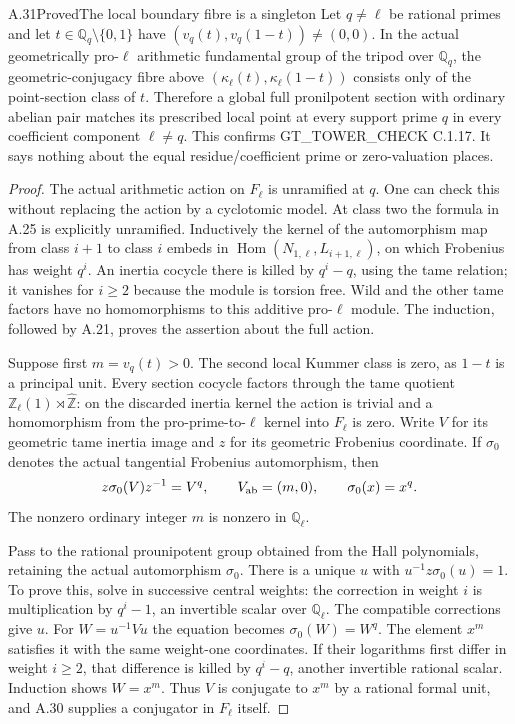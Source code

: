 \begin{result}{A.31}{Proved}{The local boundary fibre is a singleton}
\label{coh:boundarylocal}
Let $q\ne\ell$ be rational primes and let
$t\in\mathbb Q_q\setminus\{0,1\}$ have
$(v_q(t),v_q(1-t))\ne(0,0)$. In the actual geometrically
pro-$\ell$ arithmetic fundamental group of the tripod over
$\mathbb Q_q$, the geometric-conjugacy fibre above
$(\kappa_\ell(t),\kappa_\ell(1-t))$ consists only of the
point-section class of $t$. Therefore a global full pronilpotent
section with ordinary abelian pair matches its prescribed local
point at every support prime $q$ in every coefficient component
$\ell\ne q$. This confirms GT\_TOWER\_CHECK C.1.17. It says
nothing about the equal residue/coefficient prime or zero-valuation
places.
\end{result}
\begin{proof}
The actual arithmetic action on $F_\ell$ is unramified at $q$.
One can check this without replacing the action by a cyclotomic
model. At class two the formula in A.25 is explicitly unramified.
Inductively the kernel of the automorphism map from class $i+1$ to
class $i$ embeds in
$\operatorname{Hom}(N_{1,\ell},L_{i+1,\ell})$, on which
Frobenius has weight $q^i$. An inertia cocycle there is killed by
$q^i-q$, using the tame relation; it vanishes for $i\geq2$ because
the module is torsion free. Wild and the other tame factors have no
homomorphisms to this additive pro-$\ell$ module. The induction,
followed by A.21, proves the assertion about the full action.

Suppose first $m=v_q(t)>0$. The second local Kummer class is zero,
as $1-t$ is a principal unit. Every section cocycle factors through
the tame quotient
$\mathbb Z_\ell(1)\rtimes\widehat{\mathbb Z}$: on the
discarded inertia kernel the action is trivial and a homomorphism
from the pro-prime-to-$\ell$ kernel into $F_\ell$ is zero.
Write $V$ for its geometric tame inertia image and $z$ for its
geometric Frobenius coordinate. If $\sigma_0$ denotes the actual
tangential Frobenius automorphism, then
\[
      z\sigma_0(V)z^{-1}=V^q,\qquad
      V_{\rm ab}=(m,0),\qquad \sigma_0(x)=x^q.
\]
The nonzero ordinary integer $m$ is nonzero in $\mathbb Q_\ell$.

Pass to the rational prounipotent group obtained from the Hall
polynomials, retaining the actual automorphism $\sigma_0$.
There is a unique $u$ with $u^{-1}z\sigma_0(u)=1$.
To prove this, solve in successive central weights: the correction
in weight $i$ is multiplication by $q^i-1$, an invertible scalar
over $\mathbb Q_\ell$. The compatible corrections give $u$.
For $W=u^{-1}Vu$ the equation becomes $\sigma_0(W)=W^q$.
The element $x^m$ satisfies it with the same weight-one coordinates.
If their logarithms first differ in weight $i\geq2$, that difference
is killed by $q^i-q$, another invertible rational scalar. Induction
shows $W=x^m$. Thus $V$ is conjugate to $x^m$ by a rational formal
unit, and A.30 supplies a conjugator in $F_\ell$ itself.


\end{proof}
